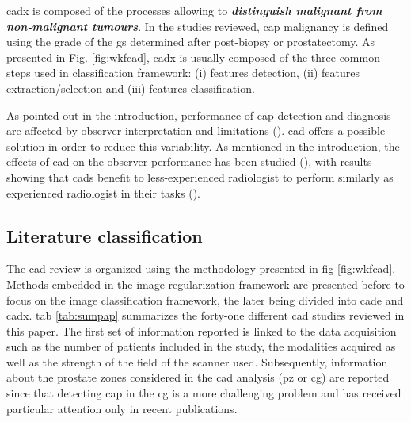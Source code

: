 \Ac{cadx} is composed of the processes allowing to \textbf{\textit{distinguish malignant from non-malignant tumours}}. In the studies reviewed, \ac{cap} malignancy is defined using the grade of the \ac{gs} determined after post-biopsy or prostatectomy. As presented in Fig. \ref{fig:wkfcad}, \ac{cadx} is usually composed of the three common steps used in classification framework: (i) features detection, (ii) features extraction/selection and (iii) features classification.

As pointed out in the introduction, performance of \ac{cap} detection and diagnosis are affected by observer interpretation and limitations (\cite{Giger2008,Hambrock2013}). \ac{cad} offers a possible solution in order to reduce this variability. As mentioned in the introduction, the effects of \ac{cad} on the observer performance has been studied (\cite{Hambrock2013}), with results showing that \acp{cad} benefit to less-experienced radiologist to perform similarly as experienced radiologist in their tasks (\cite{Hambrock2013}). 

\subsection{Literature classification}

The \ac{cad} review is organized using the methodology presented in \acs{fig} \ref{fig:wkfcad}. Methods embedded in the image regularization framework are presented before to focus on the image classification framework, the later being divided into \ac{cade} and \ac{cadx}. %
\Acl{tab} \ref{tab:sumpap} summarizes the forty-one different \ac{cad} studies reviewed in this paper. The first set of information reported is linked to the data acquisition such as the number of patients included in the study, the modalities acquired as well as the strength of the field of the scanner used. Subsequently, information about the prostate zones considered in the \ac{cad} analysis (\ac{pz} or \ac{cg}) are reported since that detecting \ac{cap} in the \ac{cg} is a more challenging problem and has received particular attention only in recent publications.

